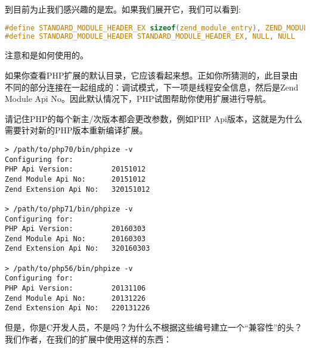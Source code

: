 {到目前为止我们感兴趣的是宏。如果我们展开它，我们可以看到:

\begin{lstlisting}[language=c]
#define STANDARD_MODULE_HEADER_EX sizeof(zend_module_entry), ZEND_MODULE_API_NO, ZEND_DEBUG, USING_ZTS
#define STANDARD_MODULE_HEADER STANDARD_MODULE_HEADER_EX, NULL, NULL
\end{lstlisting}

注意和是如何使用的。

如果你查看PHP扩展的默认目录，它应该看起来想。正如你所猜测的，此目录由不同的部分连接在一起组成的：调试模式，下一项是线程安全信息，然后是Zend Module Api No。因此默认情况下，PHP试图帮助你使用扩展进行导航。


请记住PHP的每个新主/次版本都会更改参数，例如PHP Api版本，这就是为什么需要针对新的PHP版本重新编译扩展。

\begin{lstlisting}[language=shell]
> /path/to/php70/bin/phpize -v
Configuring for:
PHP Api Version:         20151012
Zend Module Api No:      20151012
Zend Extension Api No:   320151012

> /path/to/php71/bin/phpize -v
Configuring for:
PHP Api Version:         20160303
Zend Module Api No:      20160303
Zend Extension Api No:   320160303

> /path/to/php56/bin/phpize -v
Configuring for:
PHP Api Version:         20131106
Zend Module Api No:      20131226
Zend Extension Api No:   220131226
\end{lstlisting}



但是，你是C开发人员，不是吗？为什么不根据这些编号建立一个“兼容性”的头？我们作者，在我们的扩展中使用这样的东西：

}
